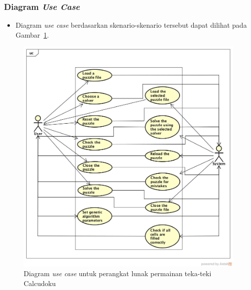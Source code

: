 \documentclass{beamer}
\begin{document}
\begin{frame}
\frametitle{Diagram \textit{Use Case}}
\begin{itemize}
\item Diagram \textit{use case} berdasarkan skenario-skenario tersebut dapat dilihat pada Gambar~\ref{fig:analisisusecase}.
\end{itemize}
\begin{figure}
\centering
\captionsetup{justification=centering}
\includegraphics[scale=0.2]{Gambar/Analisis/DiagramUseCase}
\caption[Diagram \textit{use case} untuk perangkat lunak permainan teka-teki Calcudoku]{Diagram \textit{use case} untuk perangkat lunak permainan teka-teki Calcudoku}
\label{fig:analisisusecase}
\end{figure}
\end{frame}
\end{document}
